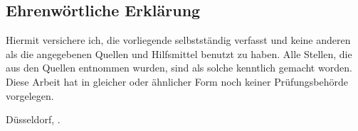 \begin{otherlanguage}{ngerman}

\chapter*{Ehrenwörtliche Erklärung}

Hiermit versichere ich, die vorliegende \thesistypegerman{} selbstständig verfasst und keine anderen als die angegebenen Quellen und Hilfsmittel benutzt zu haben.
Alle Stellen, die aus den Quellen entnommen wurden, sind als solche kenntlich gemacht worden.
Diese Arbeit hat in gleicher oder ähnlicher Form noch keiner Prüfungsbehörde vorgelegen.

\vspace{3cm}

\noindent Düsseldorf, \thesissubmissionday{}. \DTMmonthname{\thesissubmissionmonth} \thesissubmissionyear{} \hfill \thesisauthor{}

\end{otherlanguage}
